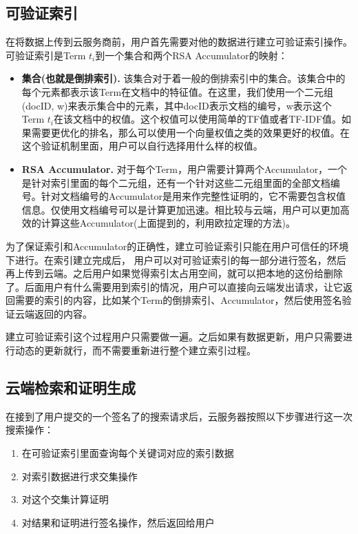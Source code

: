 \subsection{可验证索引}
在将数据上传到云服务商前，用户首先需要对他的数据进行建立可验证索引操作。可验证索引是Term $t_i$到一个集合和两个RSA Accumulator的映射：
\begin{itemize}
\item \textbf{集合(也就是倒排索引).} 该集合对于着一般的倒排索引中的集合。该集合中的每个元素都表示该Term在文档中的特征值。在这里，我们使用一个二元组(docID, w)来表示集合中的元素，其中docID表示文档的编号，w表示这个Term $t_i$在该文档中的权值。这个权值可以使用简单的TF值或者TF-IDF值。如果需要更优化的排名，那么可以使用一个向量权值\cite{qin2010letor}之类的效果更好的权值。在这个验证机制里面，用户可以自行选择用什么样的权值。
\item \textbf{RSA Accumulator.} 对于每个Term，用户需要计算两个Accumulator，一个是针对索引里面的每个二元组，还有一个针对这些二元组里面的全部文档编号。针对文档编号的Accumulator是用来作完整性证明的，它不需要包含权值信息。仅使用文档编号可以是计算更加迅速。相比较与云端，用户可以更加高效的计算这些Accumulator(上面提到的，利用欧拉定理的方法)。
\end{itemize}

为了保证索引和Accumulator的正确性，建立可验证索引只能在用户可信任的环境下进行。在索引建立完成后， 用户可以对可验证索引的每一部分进行签名，然后再上传到云端。之后用户如果觉得索引太占用空间，就可以把本地的这份给删除了。后面用户有什么需要用到索引的情况，用户可以直接向云端发出请求，让它返回需要的索引的内容，比如某个Term的倒排索引、Accumulator，然后使用签名验证云端返回的内容。

建立可验证索引这个过程用户只需要做一遍。之后如果有数据更新，用户只需要进行动态的更新就行，而不需要重新进行整个建立索引过程。

\subsection{云端检索和证明生成}
在接到了用户提交的一个签名了的搜索请求后，云服务器按照以下步骤进行这一次搜索操作：
\begin{enumerate}
\item 在可验证索引里面查询每个关键词对应的索引数据
\item 对索引数据进行求交集操作
\item 对这个交集计算证明
\item 对结果和证明进行签名操作，然后返回给用户
\end{enumerate}

